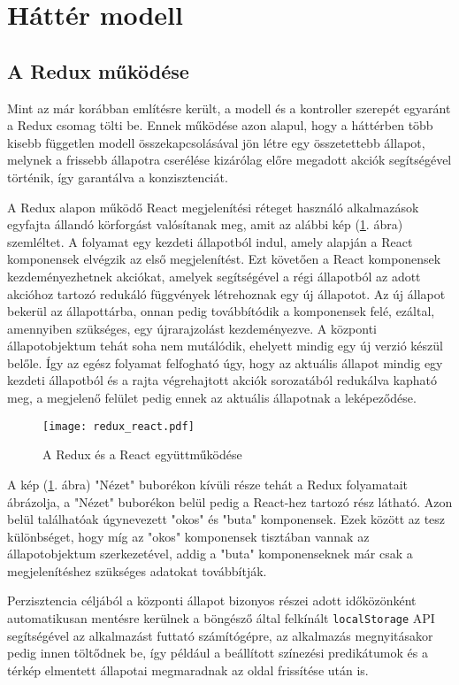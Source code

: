 \section{Háttér modell}

\subsection{A Redux működése}

Mint az már korábban említésre került, a modell és a kontroller szerepét
egyaránt a Redux csomag tölti be. Ennek működése azon alapul, hogy a háttérben
több kisebb független modell összekapcsolásával jön létre egy összetettebb
állapot, melynek a frissebb állapotra cserélése kizárólag előre megadott akciók
segítségével történik, így garantálva a konzisztenciát.

A Redux alapon működő React megjelenítési réteget használó alkalmazások egyfajta
állandó körforgást valósítanak meg, amit az alábbi kép (\ref{fig:redux_react}.
ábra) szemléltet. A folyamat egy kezdeti állapotból indul, amely alapján a
React komponensek elvégzik az első megjelenítést. Ezt követően a React
komponensek kezdeményezhetnek akciókat, amelyek segítségével a régi állapotból
az adott akcióhoz tartozó redukáló függvények létrehoznak egy új állapotot. Az
új állapot bekerül az állapottárba, onnan pedig továbbítódik a komponensek felé,
ezáltal, amennyiben szükséges, egy újrarajzolást kezdeményezve. A központi
állapotobjektum tehát soha nem mutálódik, ehelyett mindig egy új verzió készül
belőle. Így az egész folyamat felfogható úgy, hogy az aktuális állapot mindig
egy kezdeti állapotból és a rajta végrehajtott akciók sorozatából redukálva
kapható meg, a megjelenő felület pedig ennek az aktuális állapotnak a
leképeződése.

\begin{figure}[H]
  \texttt{[image: redux\_react.pdf]}
  \caption{A Redux és a React együttműködése}
  \label{fig:redux_react}
\end{figure}

A kép (\ref{fig:redux_react}. ábra) "Nézet" buborékon kívüli része tehát a Redux
folyamatait ábrázolja, a "Nézet" buborékon belül pedig a React-hez tartozó rész
látható. Azon belül találhatóak úgynevezett "okos" és "buta" komponensek. Ezek
között az tesz különbséget, hogy míg az "okos" komponensek tisztában vannak az
állapotobjektum szerkezetével, addig a "buta" komponenseknek már csak a
megjelenítéshez szükséges adatokat továbbítják.

\noindent Perzisztencia céljából a központi állapot bizonyos részei adott
időközönként automatikusan mentésre kerülnek a böngésző által felkínált
\verb|localStorage| API segítségével az alkalmazást futtató számítógépre, az
alkalmazás megnyitásakor pedig innen töltődnek be, így például a beállított
színezési predikátumok és a térkép elmentett állapotai megmaradnak az oldal
frissítése után is.
